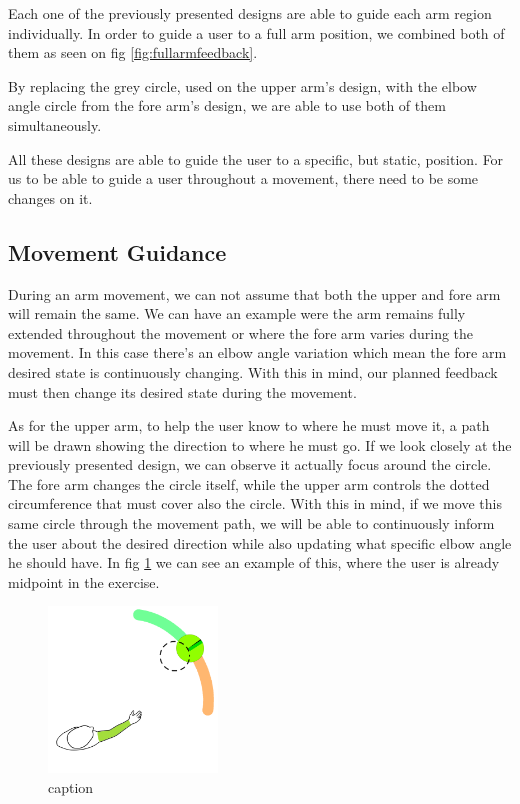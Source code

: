 Each one of the previously presented designs are able to guide each arm region individually.
In order to guide a user to a full arm position, we combined both of them as seen on fig \ref{fig:fullarmfeedback}.

By replacing the grey circle, used on the upper arm's design, with the elbow angle circle from the fore arm's design, we are able to use both of them simultaneously. 

All these designs are able to guide the user to a specific, but static, position. For us to be able to guide a user throughout a movement, there need to be some changes on it.


\subsection{Movement Guidance}

During an arm movement, we can not assume that both the upper and fore arm will remain the same. We can have an example were the arm remains fully extended throughout the movement or where the fore arm varies during the movement. In this case there's an elbow angle variation which mean the fore arm desired state is continuously changing.
With this in mind, our planned feedback must then change its desired state during the movement.

As for the upper arm, to help the user know to where he must move it, a path will be drawn showing the direction to where he must go. If we look closely at the previously presented design, we can observe it actually focus around the circle. The fore arm changes the circle itself, while the upper arm controls the dotted circumference that must cover also the circle. With this in mind, if we move this same circle through the movement path, we will be able to continuously inform the user about the desired direction while also updating what specific elbow angle he should have. In fig \ref{fig:movementguidancefeedback} we can see an example of this, where the user is already midpoint in the exercise.

\begin{figure}[!t]
    \begin{center}
        \includegraphics[width=0.4\textwidth]{imgs/movementguidancefeedback.png}
    \end{center}
    \caption{caption}
    \label{fig:movementguidancefeedback}
\end{figure}



